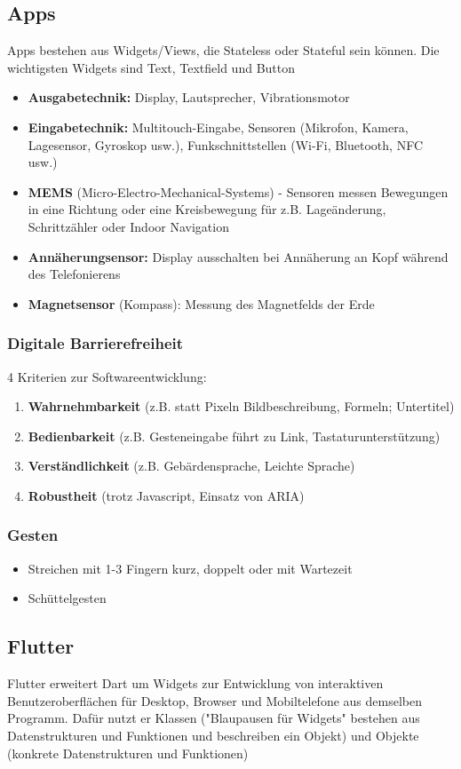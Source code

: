 \documentclass[12pt,landscape]{article}
\begin{document}
\begin{multicols}{3}
\subsection{Apps}
Apps bestehen aus Widgets/Views, die Stateless oder Stateful sein können. Die wichtigsten Widgets sind Text, Textfield und Button
\begin{itemize}
\item \textbf{Ausgabetechnik:} Display, Lautsprecher, Vibrationsmotor
\item \textbf{Eingabetechnik:} Multitouch-Eingabe, Sensoren (Mikrofon, Kamera, Lagesensor, Gyroskop usw.), Funkschnittstellen (Wi-Fi, Bluetooth, NFC usw.)
\item \textbf{MEMS} (Micro-Electro-Mechanical-Systems) - Sensoren messen Bewegungen in eine Richtung oder eine Kreisbewegung für z.B. Lageänderung, Schrittzähler oder Indoor Navigation
\item \textbf{Annäherungsensor:} Display ausschalten bei Annäherung an Kopf während des Telefonierens
\item \textbf{Magnetsensor} (Kompass): Messung des Magnetfelds der Erde
\end{itemize}
\subsubsection{Digitale Barrierefreiheit}
4 Kriterien zur Softwareentwicklung:
\begin{enumerate}
\item \textbf{Wahrnehmbarkeit} (z.B. statt Pixeln Bildbeschreibung, Formeln; Untertitel)
\item \textbf{Bedienbarkeit} (z.B. Gesteneingabe führt zu Link, Tastaturunterstützung)
\item \textbf{Verständlichkeit} (z.B. Gebärdensprache, Leichte Sprache)
\item \textbf{Robustheit} (trotz Javascript, Einsatz von ARIA) 
\end{enumerate}
\subsubsection{Gesten}
\begin{itemize}
\item Streichen mit 1-3 Fingern kurz, doppelt oder mit Wartezeit
\item Schüttelgesten
\end{itemize}
\subsection{Flutter}
Flutter erweitert Dart um Widgets zur Entwicklung von interaktiven Benutzeroberflächen für Desktop, Browser und Mobiltelefone aus demselben Programm. Dafür nutzt er Klassen ("Blaupausen für Widgets" bestehen aus Datenstrukturen und 
Funktionen und beschreiben ein Objekt) und Objekte (konkrete Datenstrukturen und Funktionen)

\end{multicols}
\end{document}
